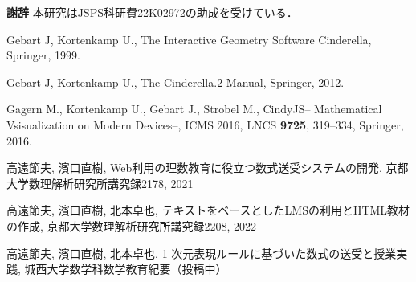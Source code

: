 \documentclass[a4j,12pt]{ujarticle}
\begin{document}
\vspace{2zw}

\noindent
{\bf 謝辞} 本研究はJSPS科研費22K02972の助成を受けている．

\begin{thebibliography}{00}

 Gebart J, Kortenkamp U., The Interactive Geometry Software Cinderella, Springer, 1999.

 Gebart J, Kortenkamp U., The Cinderella.2 Manual, Springer, 2012.

 Gagern M., Kortenkamp U., Gebart J., Strobel M., CindyJS-- Mathematical Vsisualization on Modern Devices--, ICMS 2016, LNCS \textbf{9725}, 319--334, Springer, 2016.


高遠節夫, 濱口直樹, Web利用の理数教育に役立つ数式送受システムの開発, 京都大学数理解析研究所講究録2178, 2021

高遠節夫, 濱口直樹, 北本卓也, テキストをベースとしたLMSの利用とHTML教材の作成, 京都大学数理解析研究所講究録2208, 2022

高遠節夫, 濱口直樹, 北本卓也, 1 次元表現ルールに基づいた数式の送受と授業実践, 城西大学数学科数学教育紀要（投稿中）

\end{thebibliography}
\end{document}
